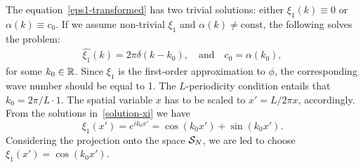 	 The equation~\eqref{eps1-transformed} has two trivial solutions: either $\xi_1(k) \equiv 0$ or $\alpha(k) \equiv c_0$. If we assume non-trivial $\xi_1$ and $\alpha(k) \neq \text{const}$, the following solves the problem:
\begin{align}
  \widehat{\xi_1}(k) = 2\pi\delta(k - k_0), \quad \text{and} \quad c_0 = \alpha(k_0), \label{solution-xi}
\end{align}
	 for some $k_0 \in \mathbb{R}$. 
	Since $\xi_1$ is the first-order approximation to $\phi$, the corresponding wave number should be equal to 1. The $L$-periodicity condition entails that $k_0 = 2\pi/L\cdot 1$. The spatial variable $x$ has to be scaled to $x'= L/2\pi x$, accordingly. From the solutions in~\eqref{solution-xi} we have 
\begin{equation}
	\xi_1(x') = e^{ik_0x'} = \cos(k_0x') + \sin(k_0x').
\end{equation}	
Considering the projection onto the space $\mathcal{S}_N$, we are led to choose $\xi_1(x') = \cos(k_0x')$.
%
%
%

